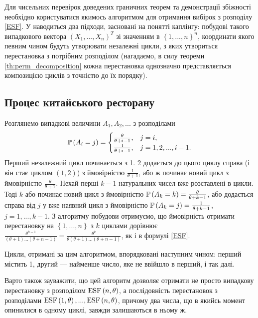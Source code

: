 Для чисельних перевірок доведених граничних теорем та демонстрації збіжності
необхідно користуватися якимось алгоритмом для отримання вибірок
з розподілу \eqref{ESF}. 
У \cite{Arratia} наводиться два підходи,
засновані на понятті каплінгу: побудові такого випадкового вектора
$\left(X_1, ..., X_n\right)^T$ зі значенням в
$\left\{1,...,n\right\}^n$, координати якого певним чином
будуть утворювати незалежні цикли, з яких утвориться перестановка
з потрібним розподілом (нагадаємо, в силу теореми \ref{th:perm_decomposition}
кожна перестановка однозначно представляється композицією циклів
з точністю до їх порядку). 

\subsection{Процес китайського ресторану}
Розглянемо випадкові величини $A_1, A_2, ...$ з розподілами
\begin{gather}\label{chinese_rest}
    \P{A_i = j} = \begin{cases}
        \frac{\theta}{\theta + i - 1}, & j = i, \\
        \frac{1}{\theta + i - 1}, & j = 1, 2, ..., i-1.
    \end{cases}
\end{gather}
Перший незалежний цикл починається з 1. 2 додається до цього циклу справа
(і він стає циклом $(1, 2)$) з ймовірністю $\frac{1}{\theta+1}$,
або ж починає новий цикл з ймовірністю $\frac{\theta}{\theta+1}$.
Нехай перші $k-1$ натуральних чисел вже розставлені в цикли.
Тоді $k$ або починає новий цикл з ймовірністю $\P{A_k = k} = \frac{\theta}{\theta + k - 1}$,
або додається справа від $j$ у вже наявний цикл з ймовірністю
$\P{A_k = j} = \frac{1}{\theta + k - 1}$, $j = 1,...,k-1$.
З алгоритму побудови отримуємо, що ймовірність отримати перестановку
на $\left\{1,...,n\right\}$
з $k$ циклами дорівнює
$\frac{\theta^{k-1}}{
    (\theta + 1) \dots (\theta + n - 1)
} = 
\frac{\theta^{k}}{
    \theta(\theta + 1) \dots (\theta + n - 1)
}
$, як і в формулі \eqref{ESF}.

Цикли, отримані за цим алгоритмом, впорядковані наступним чином:
перший містить 1, другий --- найменше число, яке не ввійшло в перший, і так далі.

Варто також зауважити, що цей алгоритм дозволяє отримати не просто
випадкову перестановку з розподілом $\ESF{n, \theta}$,
а послідовність перестановок з розподілами 
$\ESF{1, \theta}, ..., \ESF{n, \theta}$, причому два числа,
що в якийсь момент опинилися в одному циклі, завжди залишаються в ньому ж.

